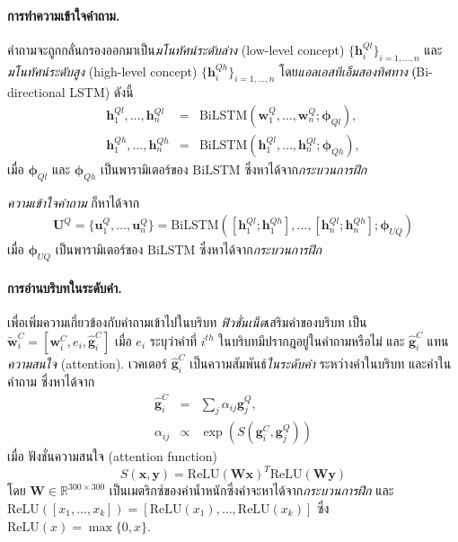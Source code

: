 \paragraph{การทำความเข้าใจคำถาม.}
คำถามจะถูกกลั่นกรองออกมาเป็น\textit{มโนทัศน์ระดับล่าง} (low-level concept) $\{\bm{h}^{Ql}_i\}_{i=1,\ldots,n}$
และ\textit{มโนทัศน์ระดับสูง} (high-level concept) $\{\bm{h}^{Qh}_i\}_{i=1,\ldots,n}$
โดย\textit{แอลเอสทีเอ็มสองทิศทาง} (ฺBi-directional LSTM\cite{GravesSchmidhuber2005a}) ดังนี้
%
\begin{eqnarray}
\bm{h}^{Ql}_1, \ldots, \bm{h}^{Ql}_n 
&=& \mathrm{BiLSTM}(\bm{w}^Q_1, \ldots, \bm{w}^Q_n; \bm{\phi}_{Ql}),
\label{eq: opt fusion net hQ low}
\\
\bm{h}^{Qh}_1, \ldots, \bm{h}^{Qh}_n 
&=& \mathrm{BiLSTM}(\bm{h}^{Ql}_1, \ldots, \bm{h}^{Ql}_n; \bm{\phi}_{Qh}),
\label{eq: opt fusion net hQ high}
\end{eqnarray}
เมื่อ $\bm{\phi}_{Ql}$ และ 
$\bm{\phi}_{Qh}$ เป็นพารามิเตอร์ของ $\mathrm{BiLSTM}$ ซึ่งหาได้จาก\textit{กระบวนการฝึก}

\textit{ความเข้าใจคำถาม} ก็หาได้จาก
%
\begin{eqnarray}
\bm{U}^Q = \{\bm{u}^Q_1, \ldots, \bm{u}^Q_n \} = 
\mathrm{BiLSTM}(
[\bm{h}^{Ql}_1; \bm{h}^{Qh}_1], \ldots, 
[\bm{h}^{Ql}_n; \bm{h}^{Qh}_n]
; \bm{\phi}_{UQ})
\end{eqnarray}
เมื่อ $\bm{\phi}_{UQ}$ เป็นพารามิเตอร์ของ $\mathrm{BiLSTM}$ ซึ่งหาได้จาก\textit{กระบวนการฝึก}

\paragraph{การอ่านบริบทในระดับคำ.}
เพื่อเพิ่มความเกี่ยวข้องกับคำถามเข้าไปในบริบท
\textit{ฟิวชั่นเน็ต}เสริมคำของบริบท เป็น
$\bm{\tilde{w}}^C_i = [\bm{w}^C_i, e_i, \bm{\hat{g}}^C_i]$
เมื่อ
$e_i$ ระบุว่าคำที่ $i^{th}$ ในบริบทมีปรากฎอยู่ในคำถามหรือไม่
และ
$\bm{\hat{g}}^C_i$
แทน\textit{ความสนใจ} (attention).
เวคเตอร์ $\bm{\hat{g}}^C_i$ เป็นความสัมพันธ์\textit{ในระดับคำ}
ระหว่างคำในบริบท และคำในคำถาม ซึ่งหาได้จาก
%
\begin{eqnarray}
\bm{\hat{g}}^C_i &=& \sum_j \alpha_{ij} \bm{g}_j^Q,
\label{eq: opt fusion-net g hat alpha}
\\
\alpha_{ij} &\propto& \exp{(S(\bm{g}^C_i, \bm{g}^Q_j))}
\label{eq: opt fusion-net g hat alpha 2}
\end{eqnarray}
เมื่อ ฟังชั่นความสนใจ (attention function)
\begin{equation}
S(\bm{x},\bm{y}) = \mathrm{ReLU}(\bm{W} \bm{x})^T \mathrm{ReLU}(\bm{W} \bm{y})
\label{eq: opt funsion net attention function}
\end{equation}
โดย $\bm{W} \in \mathbb{R}^{300 \times 300}$ เป็นเมตริกซ์ของค่าน้ำหนักซึ่งค่าจะหาได้จาก\textit{กระบวนการฝึก}
และ $\mathrm{ReLU}([x_1, \ldots, x_k]) = [\mathrm{ReLU}(x_1), \ldots, \mathrm{ReLU}(x_k)]$ 
ซึ่ง $\mathrm{ReLU}(x) = \max\{0, x\}$.

